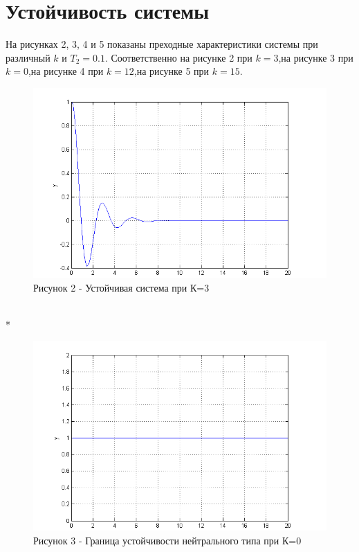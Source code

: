 \documentclass[a4paper, 12pt]{article}
\begin{document}
\section*{ Устойчивость системы}
На рисунках 2, 3, 4 и 5 показаны преходные характеристики системы при различный $k$ и $T_2 = 0.1$. Соответственно на рисунке 2 при $k = 3$,на рисунке 3  при $k = 0$,на рисунке 4 при $k = 12$,на рисунке 5 при $k = 15$. \\
\begin{figure}[h]
	\centering
	\includegraphics[width = 1\linewidth]{1.png} \\
  \centering Рисунок 2 - Устойчивая система при К=3
\end{figure} 
\hfill\\*
\newpage
\begin{figure}[h]
	\centering
	\includegraphics[width = 1\textwidth]{2.png} \\
  \centering Рисунок 3 - Граница устойчивости нейтрального типа при К=0
\end{figure}
\end{document}
